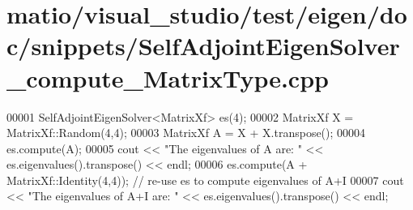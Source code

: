 \hypertarget{matio_2visual__studio_2test_2eigen_2doc_2snippets_2_self_adjoint_eigen_solver__compute___matrix_type_8cpp_source}{}\section{matio/visual\+\_\+studio/test/eigen/doc/snippets/\+Self\+Adjoint\+Eigen\+Solver\+\_\+compute\+\_\+\+Matrix\+Type.cpp}
\label{matio_2visual__studio_2test_2eigen_2doc_2snippets_2_self_adjoint_eigen_solver__compute___matrix_type_8cpp_source}

\begin{DoxyCode}
00001 SelfAdjointEigenSolver<MatrixXf> es(4);
00002 MatrixXf X = MatrixXf::Random(4,4);
00003 MatrixXf A = X + X.transpose();
00004 es.compute(A);
00005 cout << \textcolor{stringliteral}{"The eigenvalues of A are: "} << es.eigenvalues().transpose() << endl;
00006 es.compute(A + MatrixXf::Identity(4,4)); \textcolor{comment}{// re-use es to compute eigenvalues of A+I}
00007 cout << \textcolor{stringliteral}{"The eigenvalues of A+I are: "} << es.eigenvalues().transpose() << endl;
\end{DoxyCode}
